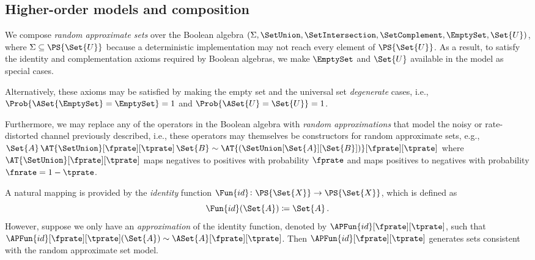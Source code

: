 \subsection{Higher-order models and composition}
\label{sec:higher_order_model}

We compose \emph{random approximate sets} over the Boolean algebra $(\Sigma,\SetUnion,\SetIntersection,\SetComplement,\EmptySet,\Set{U})$, where $\Sigma \subseteq \PS{\Set{U}}$ because a deterministic implementation may not reach every element of $\PS{\Set{U}}$.
As a result, to satisfy the identity and complementation axioms required by Boolean algebras, we make $\EmptySet$ and $\Set{U}$ available in the model as special cases.
\begin{remark}
	Alternatively, these axioms may be satisfied by making the empty set and the universal set \emph{degenerate} cases, i.e., $\Prob{\ASet{\EmptySet} = \EmptySet} = 1$ and $\Prob{\ASet{U} = \Set{U}} = 1$.
\end{remark}

Furthermore, we may replace any of the operators in the Boolean algebra with \emph{random approximations} that model the noisy or rate-distorted channel previously described, i.e., these operators may themselves be constructors for random approximate sets, e.g., $\Set{A} \, \AT{\SetUnion}[\fprate][\tprate] \, \Set{B} \sim \AT{(\SetUnion[\Set{A}][\Set{B}])}[\fprate][\tprate]$ where $\AT{\SetUnion}[\fprate][\tprate]$ maps negatives to positives with probability $\fprate$ and maps positives to negatives with probability $\fnrate = 1 - \tprate$.

A natural mapping is provided by the \emph{identity} function $\Fun{id} \colon \PS{\Set{X}} \to \PS{\Set{X}}$, which is defined as
\begin{equation}
\Fun{id}(\Set{A}) \coloneqq \Set{A}\,.
\end{equation}
However, suppose we only have an \emph{approximation} of the identity function, denoted by $\APFun{id}[\fprate][\tprate]$, such that $\APFun{id}[\fprate][\tprate](\Set{A}) \sim \ASet{A}[\fprate][\tprate]$.
Then $\APFun{id}[\fprate][\tprate]$ generates sets consistent with the random approximate set model.

